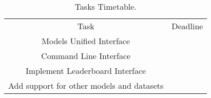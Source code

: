 \begin{table}
 \begin{tabular}{|c|c|}
 Task & Deadline \\
     Models Unified Interface & \\
     Command Line Interface & \\
     Implement Leaderboard Interface & \\
     Add support for other models and datasets & \\
 \end{tabular}
 \caption{Tasks Timetable.}\label{tab:timetable}
  \end{table}
